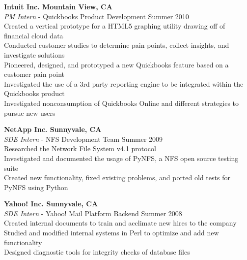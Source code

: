 \documentclass[margin,line]{resume}
\begin{document}
\begin{resume}
		\textbf{\listing Intuit Inc. \hfill Mountain View, CA}\\
    \textsl{PM Intern} - Quickbooks Product Development \hfill Summer 2010\\
			\hspace*{\identsize} Created a vertical prototype for a HTML5 graphing utility drawing off of financial cloud data\\
			\hspace*{\identsize} Conducted customer studies to determine pain points, collect insights, and investigate solutions\\
			\hspace*{\identsize} Pioneered, designed, and prototyped a new Quickbooks feature based on a customer pain point\\
			\hspace*{\identsize} Investigated the use of a 3rd party reporting engine to be integrated within the Quickbooks product\\
			\hspace*{\identsize} Investigated nonconsumption of Quickbooks Online and different strategies to pursue new users
		\vspace{-2mm}

		\textbf{\listing NetApp Inc. \hfill Sunnyvale, CA}\\
    \textsl{SDE Intern} - NFS Development Team \hfill Summer 2009\\
			\hspace*{\identsize} Researched the Network File System v4.1 protocol\\
			\hspace*{\identsize} Investigated and documented the usage of PyNFS, a NFS open source testing suite\\
			\hspace*{\identsize} Created new functionality, fixed existing problems, and ported old tests for PyNFS using Python
		\vspace{-2mm}

		\textbf{\listing Yahoo! Inc. \hfill Sunnyvale, CA}\\
    \textsl{SDE Intern} - Yahoo! Mail Platform Backend \hfill Summer 2008\\
			\hspace*{\identsize} Created internal documents to train and acclimate new hires to the company\\
			\hspace*{\identsize} Studied and modified internal systems in Perl to optimize and add new functionality\\
			\hspace*{\identsize} Designed diagnostic tools for integrity checks of database files


\end{resume}
\end{document}
